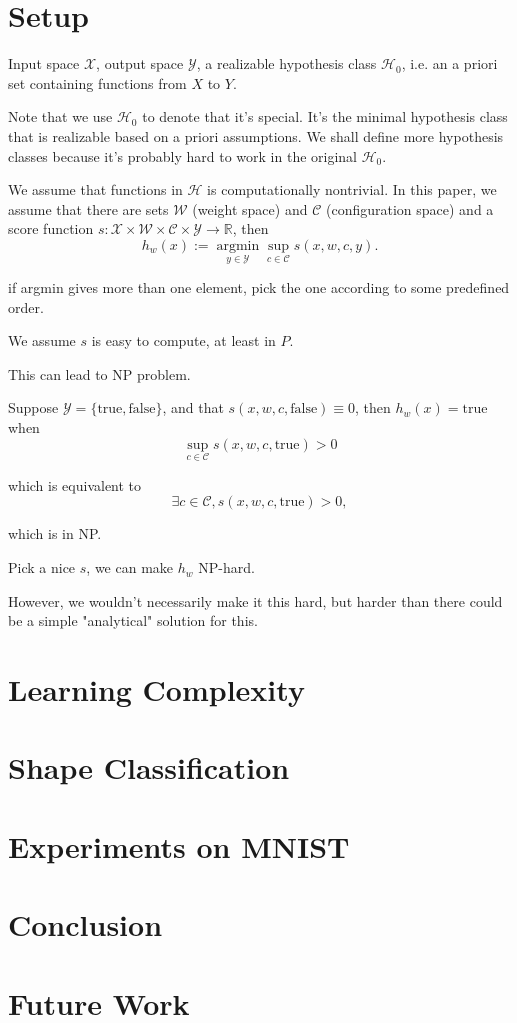 \documentclass[11pt, oneside]{article}   	%
\theoremstyle{definition}
\begin{document}
\section{Setup}

Input space $\mathcal{X}$, output space $\mathcal{Y}$, a realizable hypothesis class $\mathcal{H}_0$, i.e. an a priori set containing functions from $X$ to $Y$.

Note that we use $\mathcal{H}_0$ to denote that it's special. It's the minimal hypothesis class that is realizable based on a priori assumptions. We shall define more hypothesis classes because it's probably hard to work in the original $\mathcal{H}_0$.

We assume that functions in $\mathcal{H}$ is computationally nontrivial. In this paper, we assume that there are sets $\mathcal{W}$ (weight space) and $\mathcal{C}$ (configuration space) and a score function $s: \mathcal{X}\times \mathcal{W}\times \mathcal{C}\times \mathcal{Y}\to \mathbb{R}$, then
\begin{equation}
	h_{w}(x):=\mathop{\text{argmin}}\limits_{y\in \mathcal{Y}}\sup_{c\in \mathcal{C}} s(x, w, c, y).
\end{equation}

if argmin gives more than one element, pick the one according to some predefined order.

We assume $s$ is easy to compute, at least in $P$.

\begin{rmk}
	This can lead to NP problem.

	Suppose $\mathcal{Y} = \{\text{true}, \text{false}\}$, and that $s(x,w,c,\text{false})\equiv 0$, then $h_w(x)=\text{true}$ when
	\begin{equation}
		\sup_{c\in \mathcal{C}}s(x, w, c, \text{true}) > 0
	\end{equation}

	which is equivalent to
	\begin{equation}
		\exists c\in \mathcal{C}, s(x, w, c, \text{true}) > 0,
	\end{equation}

	which is in NP.

	Pick a nice $s$, we can make $h_w$ NP-hard.

	However, we wouldn't necessarily make it this hard, but harder than there could be a simple "analytical" solution for this.
\end{rmk}

\section{Learning Complexity}

\section{Shape Classification}

\section{Experiments on MNIST}

\section{Conclusion}

\section{Future Work}
\end{document}
